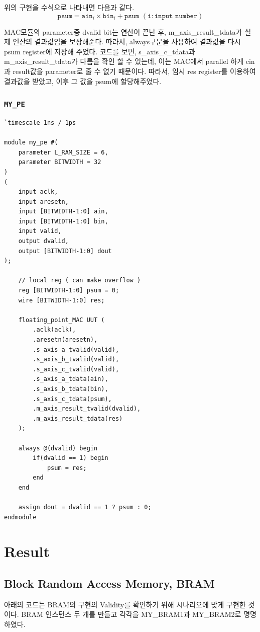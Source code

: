 \documentclass{article}
\begin{document}
위의 구현을 수식으로 나타내면 다음과 같다. 
\begin{equation*}
\texttt{psum} = \texttt{ain}_i \times \texttt{bin}_i + \texttt{psum  }(\texttt{i} : \texttt{input number}) 
\end{equation*}

MAC모듈의 parameter중 dvalid bit는 연산이 끝난 후, m\_axis\_result\_tdata가 실제 연산의 결과값임을 보장해준다. 따라서, always구문을 사용하여 결과값을 다시 psum register에 저장해 주었다. 코드를 보면, s\_axis\_c\_tdata과 m\_axis\_result\_tdata가 다름을 확인 할 수 있는데, 이는 MAC에서 parallel 하게 cin과 result값을 parameter로 줄 수 없기 때문이다. 따라서, 임시 res register를 이용하여 결과값을 받았고, 이후 그 값을 psum에 할당해주었다.

\subsubsection*{\texttt{MY\_PE}}
\begin{lstlisting}[style={verilog-style}]
`timescale 1ns / 1ps

module my_pe #(
    parameter L_RAM_SIZE = 6,
    parameter BITWIDTH = 32
)
(
    input aclk,
    input aresetn,
    input [BITWIDTH-1:0] ain,
    input [BITWIDTH-1:0] bin,
    input valid,
    output dvalid,
    output [BITWIDTH-1:0] dout
);

    // local reg ( can make overflow )
    reg [BITWIDTH-1:0] psum = 0;
    wire [BITWIDTH-1:0] res;
    
    floating_point_MAC UUT (
        .aclk(aclk),
        .aresetn(aresetn),
        .s_axis_a_tvalid(valid),
        .s_axis_b_tvalid(valid),
        .s_axis_c_tvalid(valid),
        .s_axis_a_tdata(ain),
        .s_axis_b_tdata(bin),
        .s_axis_c_tdata(psum),
        .m_axis_result_tvalid(dvalid), 
        .m_axis_result_tdata(res)
    );
  
    always @(dvalid) begin
        if(dvalid == 1) begin
            psum = res;
        end
    end
    
    assign dout = dvalid == 1 ? psum : 0;
endmodule
\end{lstlisting}

\newpage
\section{Result}

\subsection{Block Random Access Memory, BRAM}
아래의 코드는 BRAM의 구현의 Validity를 확인하기 위해 시나리오에 맞게 구현한 것이다. BRAM 인스턴스 두 개를 만들고 각각을 MY\_BRAM1과 MY\_BRAM2로 명명하였다. 
\end{document}
